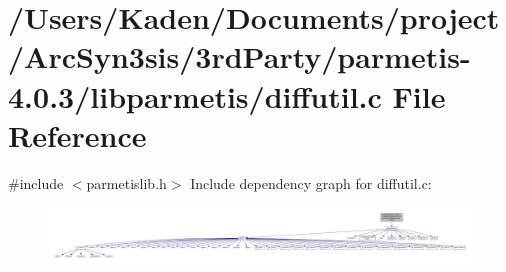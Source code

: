 \hypertarget{a00353}{}\section{/\+Users/\+Kaden/\+Documents/project/\+Arc\+Syn3sis/3rd\+Party/parmetis-\/4.0.3/libparmetis/diffutil.c File Reference}
\label{a00353}
{\ttfamily \#include $<$parmetislib.\+h$>$}\newline
Include dependency graph for diffutil.\+c\+:\nopagebreak
\begin{figure}[H]
\begin{center}
\leavevmode
\includegraphics[width=350pt]{a00354}
\end{center}
\end{figure}
